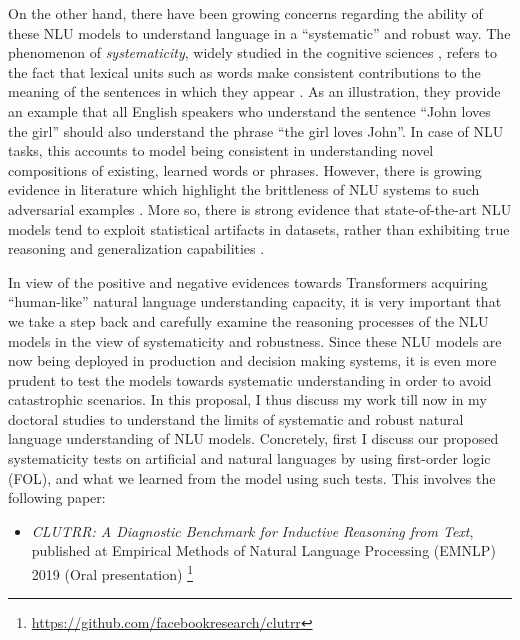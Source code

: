 \documentclass[12pt]{article}
\begin{document}
On the other hand, there have been growing concerns regarding the ability of these NLU models to understand language in a ``systematic'' and robust way. The phenomenon of \textit{systematicity}, widely studied in the cognitive sciences \cite{gentner1986systematicity}, refers to the fact that lexical units such as words make consistent contributions to the meaning of the sentences in which they appear \cite{fodor1988connectionism}. As an illustration, they provide an example that all English speakers who understand the sentence ``John loves the girl'' should also understand the phrase ``the girl loves John''. In case of NLU tasks, this accounts to model being consistent in understanding novel compositions of existing, learned words or phrases. However, there is growing evidence in literature which highlight the brittleness of NLU systems to such adversarial examples \cite{jia2016,jin2020bert}. More so, there is strong evidence that state-of-the-art NLU models tend to exploit statistical artifacts in datasets, rather than exhibiting true reasoning and generalization capabilities \cite{gururangan2018a,poliak-etal-2018-hypothesis,tsuchiya-2018-performance,naik-etal-2018-stress,mccoy2019}.

In view of the positive and negative evidences towards Transformers acquiring ``human-like'' natural language understanding capacity, it is very important that we take a step back and carefully examine the reasoning processes of the NLU models in the view of systematicity and robustness. Since these NLU models are now being deployed in production and decision making systems, it is even more prudent to test the models towards systematic understanding in order to avoid catastrophic scenarios. In this proposal, I thus discuss my work till now in my doctoral studies to understand the limits of systematic and robust natural language understanding of NLU models. Concretely, first I discuss our proposed systematicity tests on artificial and natural languages by using first-order logic (FOL), and what we learned from the model using such tests. This involves the following paper:

\begin{itemize}
  \item \textit{CLUTRR: A Diagnostic Benchmark for Inductive Reasoning from Text}, published at Empirical Methods of Natural Language Processing (EMNLP) 2019 (Oral presentation) \cite{sinha2019a} \footnote{\href{https://github.com/facebookresearch/clutrr}{https://github.com/facebookresearch/clutrr}}
\end{itemize}
\end{document}
